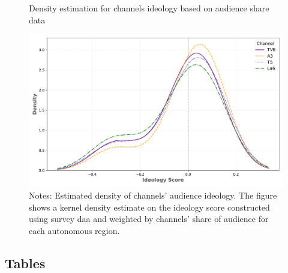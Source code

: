 \documentclass[12pt]{article}
\begin{document}
	
	\begin{figure}[H]
		\centering
		\caption{Density estimation for channels ideology based on audience share data}
		\includegraphics[width=120mm]{figures/channel_ideology_density_python}
		\caption*{\small Notes: Estimated density of channels' audience ideology. The figure shows a kernel density estimate on the ideology score constructed using survey daa and weighted by channels' share of audience for each autonomous region. }
		\label{fig:density}
	\end{figure}
	
	
	\subsection{Tables}
	
	
	
\end{document}
